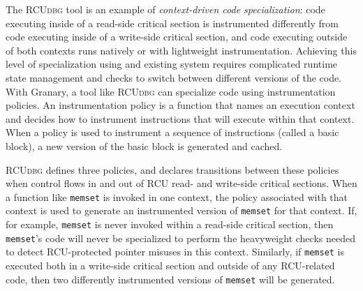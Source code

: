 \documentclass[preprint]{sigplanconf}
\newcommand{\toolname}[1]{{\scshape #1}}
\begin{document}

The \toolname{RCUdbg} tool is an example of \emph{context-driven code specialization}: code executing inside of a read-side critical section is instrumented differently from code executing inside of a write-side critical section, and code executing outside of both contexts runs natively or with lightweight instrumentation. Achieving this level of specialization using and existing system requires complicated runtime state management and checks to switch between different versions of the code. With Granary, a tool like \toolname{RCUdbg} can specialize code using instrumentation policies. An instrumentation policy is a function that names an execution context and decides how to instrument instructions that will execute within that context. When a policy is used to instrument a sequence of instructions (called a basic block), a new version of the basic block is generated and cached. 

\toolname{RCUdbg} defines three policies, and declares transitions between these policies when control flows in and out of RCU read- and write-side critical sections. When a function like \texttt{memset} is invoked in one context, the policy associated with that context is used to generate an instrumented version of \texttt{memset} for that context. If, for example, \texttt{memset} is never invoked within a read-side critical section, then \texttt{memset}'s code will never be specialized to perform the heavyweight checks needed to detect RCU-protected pointer misuses in this context. Similarly, if \texttt{memset} is executed both in a write-side critical section and outside of any RCU-related code, then two differently instrumented versions of \texttt{memset} will be generated.
\end{document}
